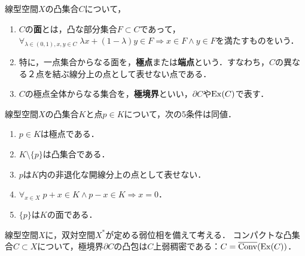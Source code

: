 \documentclass[uplatex,dvipdfmx]{jsreport}
\begin{document}
\begin{definition}
    線型空間$X$の凸集合$C$について，
    \begin{enumerate}
        \item $C$の\textbf{面}とは，凸な部分集合$F\subset C$であって，$\forall_{\lambda\in(0,1),x,y\in C}\;\lambda x+(1-\lambda)y\in F\Rightarrow x\in F\land y\in F$を満たすものをいう．
        \item 特に，一点集合からなる面を，\textbf{極点}または\textbf{端点}という．すなわち，$C$の異なる２点を結ぶ線分上の点として表せない点である．
        \item $C$の極点全体からなる集合を，\textbf{極境界}といい，$\partial C$や$\mathrm{Ex}(C)$で表す．
    \end{enumerate}
\end{definition}

\begin{proposition}[極点の特徴付け]
    線型空間$X$の凸集合$K$と点$p\in K$について，次の5条件は同値．
    \begin{enumerate}
        \item $p\in K$は極点である．
        \item $K\setminus\{p\}$は凸集合である．
        \item $p$は$K$内の非退化な開線分上の点として表せない．
        \item $\forall_{x\in X}\;p+x\in K\land p-x\in K\Rightarrow x=0$．
        \item $\{p\}$は$K$の面である．
    \end{enumerate}
\end{proposition}

\begin{theorem}
    線型空間$X$に，双対空間$X^*$が定める弱位相を備えて考える．
    コンパクトな凸集合$C\subset X$について，極境界$\partial C$の凸包は$C$上弱稠密である：$C=\overline{\mathrm{Conv}}(\mathrm{Ex}(C))$．
\end{theorem}
\end{document}
